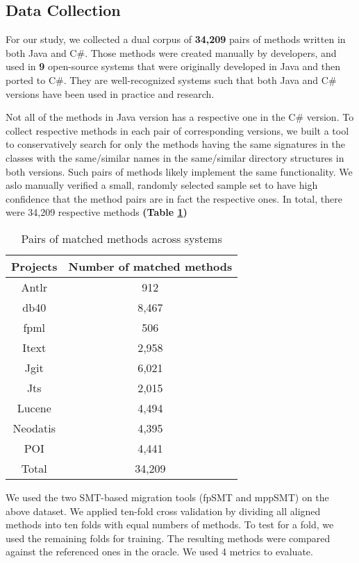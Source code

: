 \subsection{Data Collection}
For our study, we collected a dual corpus of \textbf{34,209} pairs of methods written in both Java and C\#. Those methods were created manually by developers, and used in \textbf{9} open-source systems that were originally  developed in Java and then ported to C\#. They are well-recognized systems such that both Java and C\# versions have been used in practice and research.\cite{ZhongICSE10}

Not all of the methods in Java version has a respective one in the C\# version. To collect respective methods in each pair of corresponding
versions, we built a tool to conservatively search for
only the methods having the same signatures in the classes with
the same/similar names in the same/similar directory structures
in both versions. Such pairs of methods likely implement the
same functionality. We aslo manually verified a small, randomly
selected sample set to have high confidence that the method
pairs are in fact the respective ones. In total, there were 34,209 respective methods \textbf{(Table \ref{table:methods})}

\begin{table}
\begin{tabular}{|c | c|}
\hline
Projects & Number of matched methods \\
\hline
Antlr & 912 \\
db40 & 8,467 \\
fpml & 506	\\
Itext & 2,958	\\
Jgit & 6,021 	\\
Jts & 2,015	\\
Lucene & 4,494	\\
Neodatis & 4,395	\\
POI & 4,441 \\
\hline
Total & 34,209 \\
\hline
\end{tabular}
\caption{Pairs of matched methods across systems}
\label{table:methods}
\end{table}
We used the two SMT-based migration tools (fpSMT and mppSMT) on the above dataset. We applied ten-fold
cross validation by dividing all aligned methods into ten folds
with equal numbers of methods. To test for a fold, we used
the remaining folds for training. The resulting methods were compared against the referenced ones in the oracle. We used 4 metrics to evaluate. 

